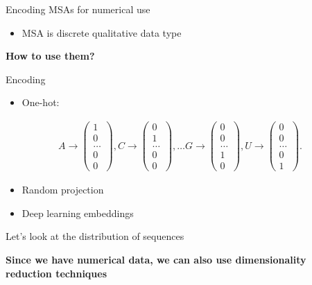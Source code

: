 \documentclass[presentation,smaller]{beamer}
\begin{document}
\begin{frame}[label={sec:orgdd74f12}]{Encoding MSAs for numerical use}
\begin{itemize}
\item MSA is discrete qualitative data type
\end{itemize}

\begin{center}
\textbf{How to use them?}
\end{center}

\begin{block}{Encoding}
\begin{itemize}
\item One-hot:
\end{itemize}
\begin{equation*}
\begin{split}
A \rightarrow \begin{pmatrix} 1\\ 0\\ \dots \\ 0\\ 0 \end{pmatrix},
C \rightarrow \begin{pmatrix} 0\\ 1\\ \dots \\ 0\\ 0 \end{pmatrix},
\dots
G \rightarrow \begin{pmatrix} 0\\ 0\\ \dots \\ 1\\ 0 \end{pmatrix},
U \rightarrow \begin{pmatrix} 0\\ 0\\ \dots \\ 0\\ 1 \end{pmatrix}.
\end{split}
\end{equation*}
\begin{itemize}
\item Random projection
\item Deep learning embeddings
\end{itemize}
\end{block}
\end{frame}

\begin{frame}[label={sec:orgeb8526c}]{Let's look at the distribution of sequences}
\begin{center}
\Large \textbf{Since we have numerical data, we can also use dimensionality reduction techniques}
\end{center}
\end{frame}
\end{document}
